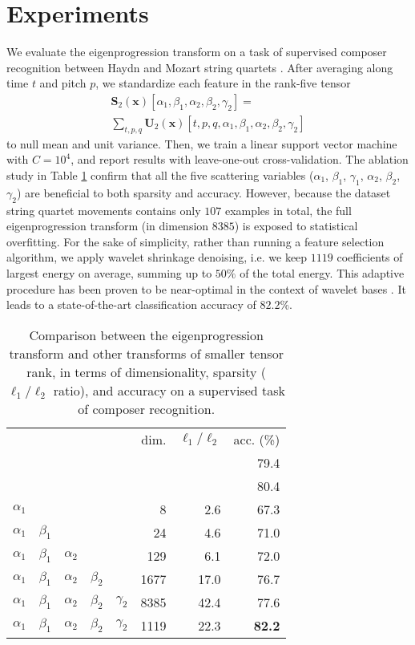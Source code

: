 \documentclass{article}
\makeatletter
\def\ie{i.e.\@\xspace}
\makeatother
\begin{document}
\section{Experiments}
We evaluate the eigenprogression transform on a task of supervised composer recognition between Haydn and Mozart string quartets \cite{vankranenburg2005chapter}.
After averaging along time $t$ and pitch $p$, we standardize each feature in the rank-five tensor
\begin{multline}
\mathbf{S}_2 (\boldsymbol{x})[\alpha_1,\beta_1,\alpha_2,\beta_2,\gamma_2] =
\\
\sum_{t,p,q} \mathbf{U}_2 (\boldsymbol{x})[t,p,q,\alpha_1,\beta_1,\alpha_2,\beta_2,\gamma_2]
\end{multline}
to null mean and unit variance.
Then, we train a linear support vector machine with $C=10^4$, and report results with leave-one-out cross-validation.
The ablation study in Table \ref{table:results} confirm that all the five scattering variables ($\alpha_1$, $\beta_1$, $\gamma_1$, $\alpha_2$, $\beta_2$, $\gamma_2$) are beneficial to both sparsity and accuracy.
However, because the dataset string quartet movements contains only $107$ examples in total, the full eigenprogression transform (in dimension $8385$) is exposed to statistical overfitting.
For the sake of simplicity, rather than running a feature selection algorithm, we apply wavelet shrinkage denoising, \ie{} we keep $1119$ coefficients of largest energy on average, summing up to $50\%$ of the total energy.
This adaptive procedure has been proven to be near-optimal in the context of wavelet bases \cite{donoho1994biometrika}.
It leads to a state-of-the-art classification accuracy of $82.2\%$.

\begin{table}[]
\begin{tabular}{lllllrrr}
& & & & & dim. & $\ell_1/\ell_2$ & acc. (\%) \\
\cite{vankranenburg2005chapter} & & & & & & & 79.4 \\
\cite{velarde2016ismir} & & & & & & & 80.4 \\
\hline
$\alpha_1$ &  & &  & & 8 & 2.6 & 67.3 \\
$\alpha_1$ & $\beta_1$  & & & & 24 & 4.6 & 71.0 \\
$\alpha_1$ & $\beta_1$  & $\alpha_2$ & & & 129 & 6.1 & 72.0 \\
$\alpha_1$ & $\beta_1$  & $\alpha_2$ & $\beta_2$ & & 1677 & 17.0 & 76.7 \\
$\alpha_1$ & $\beta_1$  & $\alpha_2$ & $\beta_2$ & $\gamma_2$ & 8385 & 42.4 & 77.6 \\
$\alpha_1$ & $\beta_1$  & $\alpha_2$ & $\beta_2$ & $\gamma_2$ & 1119 & 22.3 & \textbf{82.2} \\
\end{tabular}
\caption{Comparison between the eigenprogression transform and other transforms of smaller tensor rank, in terms of dimensionality, sparsity ($\ell_1 / \ell_2$ ratio), and accuracy on a supervised task of composer recognition.}
\label{table:results}
\end{table}
\end{document}
